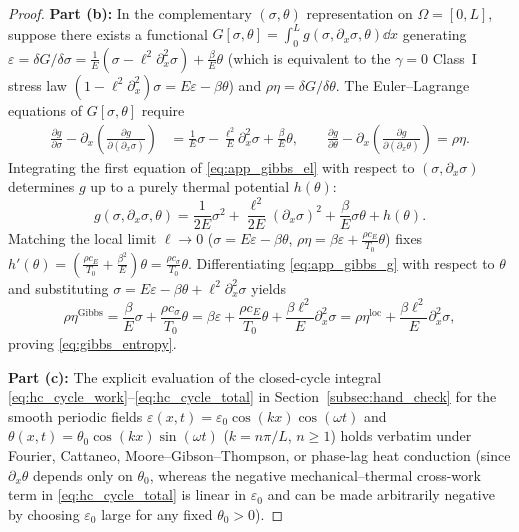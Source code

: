 \begin{proof}
\medskip\noindent\textbf{Part (b):} In the complementary $(\sigma,\theta)$ representation on $\Omega = [0,L]$, suppose there exists a functional $G[\sigma,\theta] = \int_0^L g(\sigma,\partial_x\sigma,\theta)\dd x$ generating $\varepsilon = \delta G/\delta\sigma = \frac{1}{E}(\sigma - \ell^2\partial_x^2\sigma) + \frac{\beta}{E}\theta$ (which is equivalent to the $\gamma=0$ Class~I stress law $(1-\ell^2\partial_x^2)\sigma = E\varepsilon - \beta\theta$) and $\rho\eta = \delta G/\delta\theta$. The Euler--Lagrange equations of $G[\sigma,\theta]$ require
\begin{align}\label{eq:app_gibbs_el}
  \frac{\partial g}{\partial\sigma} - \partial_x\!\left(\frac{\partial g}{\partial(\partial_x\sigma)}\right) &= \frac{1}{E}\sigma - \frac{\ell^2}{E}\partial_x^2\sigma + \frac{\beta}{E}\theta, \qquad
  \frac{\partial g}{\partial\theta} - \partial_x\!\left(\frac{\partial g}{\partial(\partial_x\theta)}\right) = \rho\eta.
\end{align}
Integrating the first equation of \eqref{eq:app_gibbs_el} with respect to $(\sigma,\partial_x\sigma)$ determines $g$ up to a purely thermal potential $h(\theta)$:
\begin{equation}\label{eq:app_gibbs_g}
  g(\sigma,\partial_x\sigma,\theta) = \frac{1}{2E}\sigma^2 + \frac{\ell^2}{2E}(\partial_x\sigma)^2 + \frac{\beta}{E}\sigma\theta + h(\theta).
\end{equation}
Matching the local limit $\ell \to 0$ ($\sigma = E\varepsilon - \beta\theta$, $\rho\eta = \beta\varepsilon + \frac{\rho c_E}{T_0}\theta$) fixes $h'(\theta) = \left(\frac{\rho c_E}{T_0} + \frac{\beta^2}{E}\right)\theta = \frac{\rho c_\sigma}{T_0}\theta$. Differentiating \eqref{eq:app_gibbs_g} with respect to $\theta$ and substituting $\sigma = E\varepsilon - \beta\theta + \ell^2\partial_x^2\sigma$ yields
\begin{equation}\label{eq:app_gibbs_eta}
  \rho\eta^{\mathrm{Gibbs}} = \frac{\beta}{E}\sigma + \frac{\rho c_\sigma}{T_0}\theta = \beta\varepsilon + \frac{\rho c_E}{T_0}\theta + \frac{\beta\ell^2}{E}\partial_x^2\sigma = \rho\eta^{\mathrm{loc}} + \frac{\beta\ell^2}{E}\partial_x^2\sigma,
\end{equation}
proving \eqref{eq:gibbs_entropy}.

\medskip\noindent\textbf{Part (c):} The explicit evaluation of the closed-cycle integral \eqref{eq:hc_cycle_work}--\eqref{eq:hc_cycle_total} in Section~\ref{subsec:hand_check} for the smooth periodic fields $\varepsilon(x,t) = \varepsilon_0\cos(kx)\cos(\omega t)$ and $\theta(x,t) = \theta_0\cos(kx)\sin(\omega t)$ ($k = n\pi/L$, $n \ge 1$) holds verbatim under Fourier, Cattaneo, Moore--Gibson--Thompson, or phase-lag heat conduction (since $\partial_x\theta$ depends only on $\theta_0$, whereas the negative mechanical--thermal cross-work term in \eqref{eq:hc_cycle_total} is linear in $\varepsilon_0$ and can be made arbitrarily negative by choosing $\varepsilon_0$ large for any fixed $\theta_0 > 0$).
\end{proof}

